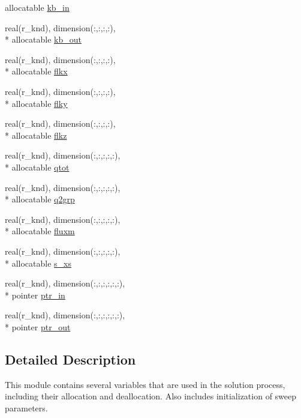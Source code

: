\begin{DoxyCompactItemize}
allocatable \hyperlink{classsolvar__module_a7e928ad260554afcde0e80147b5176dd}{kb\-\_\-in}
\item 
real(r\-\_\-knd), dimension(\-:,\-:,\-:,\-:), \\*
allocatable \hyperlink{classsolvar__module_a500e3ed7d4b1812584b2561e844a1a91}{kb\-\_\-out}
\item 
real(r\-\_\-knd), dimension(\-:,\-:,\-:,\-:), \\*
allocatable \hyperlink{classsolvar__module_a84eaccfc41511c5cd088f7d03d5f41c1}{flkx}
\item 
real(r\-\_\-knd), dimension(\-:,\-:,\-:,\-:), \\*
allocatable \hyperlink{classsolvar__module_a3fbb689b872fa887a3ecdd93d9a97ecf}{flky}
\item 
real(r\-\_\-knd), dimension(\-:,\-:,\-:,\-:), \\*
allocatable \hyperlink{classsolvar__module_ac1a71548938a72b9fa42b45c11bca3a1}{flkz}
\item 
real(r\-\_\-knd), dimension(\-:,\-:,\-:,\-:,\-:), \\*
allocatable \hyperlink{classsolvar__module_aea3d3733a1576348496e9e070924ad62}{qtot}
\item 
real(r\-\_\-knd), dimension(\-:,\-:,\-:,\-:,\-:), \\*
allocatable \hyperlink{classsolvar__module_a251ab88a6dab1f3da07d22096331b932}{q2grp}
\item 
real(r\-\_\-knd), dimension(\-:,\-:,\-:,\-:,\-:), \\*
allocatable \hyperlink{classsolvar__module_a0e9cb7f402640f1adaeeba1ca33718eb}{fluxm}
\item 
real(r\-\_\-knd), dimension(\-:,\-:,\-:,\-:,\-:), \\*
allocatable \hyperlink{classsolvar__module_ab36a684b0d77a635a3eb402da029b7b7}{s\-\_\-xs}
\item 
real(r\-\_\-knd), dimension(\-:,\-:,\-:,\-:,\-:,\-:), \\*
pointer \hyperlink{classsolvar__module_ac95d5a5e2f90e8f827801c3616afd3cc}{ptr\-\_\-in}
\item 
real(r\-\_\-knd), dimension(\-:,\-:,\-:,\-:,\-:,\-:), \\*
pointer \hyperlink{classsolvar__module_aaa582c1084c73e20d39d834455a825d1}{ptr\-\_\-out}
\end{DoxyCompactItemize}


\subsection{Detailed Description}
This module contains several variables that are used in the solution process, including their allocation and deallocation. Also includes initialization of sweep parameters. 

